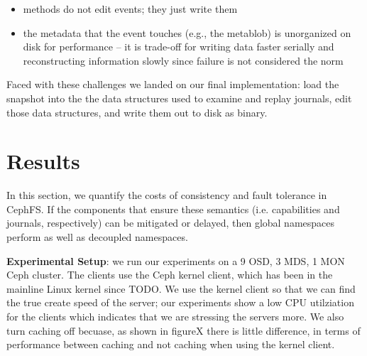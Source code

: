 \documentclass[preprint]{sigplanconf-eurosys}
\begin{document}
\begin{itemize}

  \item methods do not edit events; they just write them

  \item the metadata that the event touches (e.g., the metablob) is unorganized
  on disk for performance -- it is trade-off for writing data faster serially and
  reconstructing information slowly since failure is not considered the norm

\end{itemize}

Faced with these challenges we landed on our final implementation: load the
snapshot into the the data structures used to examine and replay journals, edit
those data structures, and write them out to disk as binary.

\section{Results}

In this section, we quantify the costs of consistency and fault tolerance in
CephFS. If the components that ensure these semantics (i.e. capabilities and
journals, respectively) can be mitigated or delayed, then global namespaces
perform as well as decoupled namespaces.

\textbf{Experimental Setup}: we run our experiments on a 9 OSD, 3 MDS, 1 MON
Ceph cluster. The clients use the Ceph kernel client, which has been in the
mainline Linux kernel since TODO. We use the kernel client so that we can find
the true create speed of the server; our experiments show a low CPU utilziation
for the clients which indicates that we are stressing the servers more. We also
turn caching off becuase, as shown in figureX there is little difference, in
terms of performance between caching and not caching when using the kernel
client.
\end{document}
